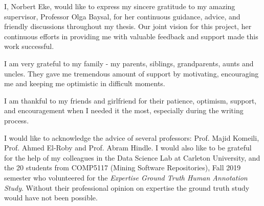 I, Norbert Eke, would like to express my sincere gratitude to my amazing supervisor, Professor Olga Baysal, for her continuous guidance, advice, and friendly discussions throughout my thesis. Our joint vision for this project, her continuous efforts in providing me with valuable feedback and support made this work successful. 

I am very grateful to my family - my parents, siblings, grandparents, aunts and uncles. They gave me tremendous amount of support by motivating, encouraging me and keeping me optimistic in difficult moments.

I am thankful to my friends and girlfriend for their patience, optimism, support, and encouragement when I needed it the most, especially during the writing process. 

I would like to acknowledge the advice of several professors: Prof. Majid Komeili, Prof. Ahmed El-Roby and Prof. Abram Hindle. I would also like to be grateful for the help of my colleagues in the Data Science Lab at Carleton University, and the 20 students from COMP5117 (Mining Software Repositories), Fall 2019 semester who volunteered for the \emph{Expertise Ground Truth Human Annotation Study}. Without their professional opinion on expertise the ground truth study would have not been possible.  
